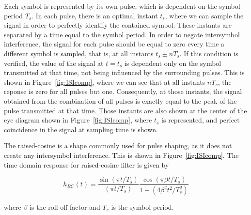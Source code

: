 	Each symbol is represented by its own pulse, which is dependent on the symbol
	period $T_s$. In each pulse, there is an optimal instant $t_s$, where we can sample the signal in
	order to perfectly identify the contained symbol. These instants are separated by a time
	equal to the symbol period. In order to negate intersymbol interference, the
	signal for each pulse should be equal to zero every time a different symbol is
	sampled, that is, at all instants $t_s \pm nT_s$. If this condition is verified,
	the value of the signal at $t=t_s$ is dependent only on the symbol transmitted
	at that time, not being influenced by the surrounding pulses. This is shown in
	Figure~\ref{fig:ISIcomp}, where we can see that at all instants $nT_s$, the
	reponse is zero for all pulses but one. Consequently, at those instants, the
	signal obtained from the combination of all pulses is exactly equal to the peak
	of the pulse transmitted at that time. Those instants are also shown at the
	center of the eye diagram shown in Figure~\ref{fig:ISIcomp}, where $t_s$ is
	represented, and perfect coincidence in the signal at sampling time is shown.

	The raised-cosine is a shape commonly used for pulse shaping, as it does not
	create any intersymbol interference. This is shown in
	Figure~\ref{fig:ISIcomp}. The time domain response for raised-cosine filter is
	given by~\cite{nguyen09}

	\begin{equation} \label{eq:rcTD}
		h_{RC}(t) = \frac{\sin(\pi t/ T_s)}{(\pi t/ T_s)} \frac{\cos(\pi \beta t
		/T_s)}{1-(4\beta^2 t^2/T_s^2)}
	\end{equation}

	\noindent where $\beta$ is the roll-off factor and $T_s$ is the symbol period.

